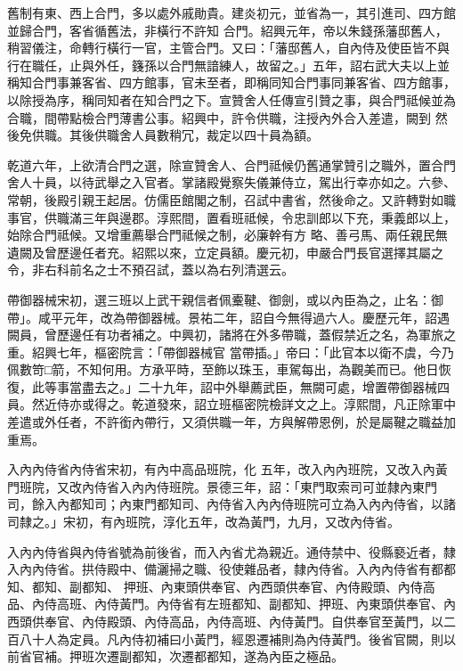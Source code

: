 \begin{pinyinscope}
 舊制有東、西上合門，多以處外戚勛貴。建炎初元，並省為一，其引進司、四方館並歸合門，客省循舊法，非橫行不許知
 合門。紹興元年，帝以朱錢孫藩邸舊人，稍習儀注，命轉行橫行一官，主管合門。又曰：「藩邸舊人，自內侍及使臣皆不與行在職任，止與外任，籛孫以合門無諳練人，故留之。」五年，詔右武大夫以上並稱知合門事兼客省、四方館事，官未至者，即稱同知合門事同兼客省、四方館事，以除授為序，稱同知者在知合門之下。宣贊舍人任傳宣引贊之事，與合門祗候並為合職，間帶點檢合門薄書公事。紹興中，許令供職，注授內外合入差遣，闕到
 然後免供職。其後供職舍人員數稍冗，裁定以四十員為額。



 乾道六年，上欲清合門之選，除宣贊舍人、合門祗候仍舊通掌贊引之職外，置合門舍人十員，以待武舉之入官者。掌諸殿覺察失儀兼侍立，駕出行幸亦如之。六參、常朝，後殿引親王起居。仿儒臣館閣之制，召試中書省，然後命之。又許轉對如職事官，供職滿三年與邊郡。淳熙間，置看班祗候，令忠訓郎以下充，秉義郎以上，始除合門祗候。又增重薦舉合門祗候之制，必廉幹有方
 略、善弓馬、兩任親民無遺闕及曾歷邊任者充。紹熙以來，立定員額。慶元初，申嚴合門長官選擇其屬之令，非右科前名之士不預召試，蓋以為右列清選云。



 帶御器械宋初，選三班以上武干親信者佩櫜鞬、御劍，或以內臣為之，止名：御帶」。咸平元年，改為帶御器械。景祐二年，詔自今無得過六人。慶歷元年，詔遇闕員，曾歷邊任有功者補之。中興初，諸將在外多帶職，蓋假禁近之名，為軍旅之重。紹興七年，樞密院言：「帶御器械官
 當帶插。」帝曰：「此官本以衛不虞，今乃佩數笴□箭，不知何用。方承平時，至飾以珠玉，車駕每出，為觀美而已。他日恢復，此等事當盡去之。」二十九年，詔中外舉薦武臣，無闕可處，增置帶御器械四員。然近侍亦或得之。乾道發來，詔立班樞密院檢詳文之上。淳熙間，凡正除軍中差遣或外任者，不許銜內帶行，又須供職一年，方與解帶恩例，於是屬鞬之職益加重焉。



 入內內侍省內侍省宋初，有內中高品班院，化
 五年，改入內內班院，又改入內黃門班院，又改內侍省入內內侍班院。景德三年，詔：「東門取索司可並隸內東門司，餘入內都知司；內東門都知司、內侍省入內內侍班院可立為入內內侍省，以諸司隸之。」宋初，有內班院，淳化五年，改為黃門，九月，又改內侍省。



 入內內侍省與內侍省號為前後省，而入內省尤為親近。通侍禁中、役縣褻近者，隸入內內侍省。拱侍殿中、備灑掃之職、役使雜品者，隸內侍省。入內內侍省有都都知、都知、副都知、
 押班、內東頭供奉官、內西頭供奉官、內侍殿頭、內侍高品、內侍高班、內侍黃門。內侍省有左班都知、副都知、押班、內東頭供奉官、內西頭供奉官、內侍殿頭、內侍高品，內侍高班、內侍黃門。自供奉官至黃門，以二百八十人為定員。凡內侍初補曰小黃門，經恩遷補則為內侍黃門。後省官闕，則以前省官補。押班次遷副都知，次遷都都知，遂為內臣之極品。




\end{pinyinscope}
